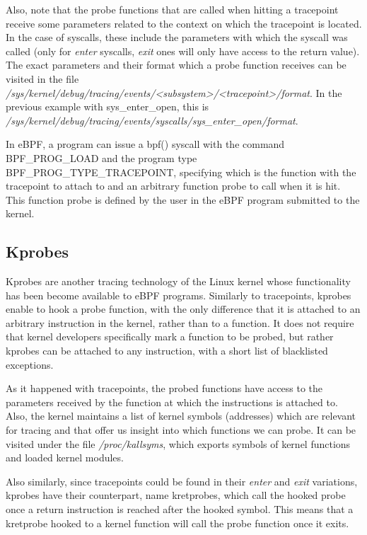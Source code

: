 \documentclass[12pt]{report} %
\begin{document}
Also, note that the probe functions that are called when hitting a tracepoint receive some parameters related to the context on which the tracepoint is located. In the case of syscalls, these include the parameters with which the syscall was called (only for \textit{enter} syscalls, \textit{exit} ones will only have access to the return value). The exact parameters and their format which a probe function receives can be visited in the file \textit{/sys/kernel/debug/tracing/events/<subsystem>/<tracepoint>/format}. In the previous example with sys\_enter\_open, this is \textit{/sys/kernel/debug/tracing/events/syscalls/sys\_enter\_open/format}.

In eBPF, a program can issue a bpf() syscall with the command BPF\_PROG\_LOAD and the program type BPF\_PROG\_TYPE\_TRACEPOINT, specifying which is the function with the tracepoint to attach to and an arbitrary function probe to call when it is hit. This function probe is defined by the user in the eBPF program submitted to the kernel.

\subsection{Kprobes}
Kprobes are another tracing technology of the Linux kernel whose functionality has been become available to eBPF programs. Similarly to tracepoints, kprobes enable to hook a probe function, with the only difference that it is attached to an arbitrary instruction in the kernel, rather than to a function\cite{kprobe_manual}. It does not require that kernel developers specifically mark a function to be probed, but rather kprobes can be attached to any instruction, with a short list of blacklisted exceptions. 

As it happened with tracepoints, the probed functions have access to the parameters received by the function at which the instructions is attached to. Also, the kernel maintains a list of kernel symbols (addresses) which are relevant for tracing and that offer us insight into which functions we can probe. It can be visited under the file \textit{/proc/kallsyms}, which exports symbols of kernel functions and loaded kernel modules\cite{kallsyms_kernel}.

Also similarly, since tracepoints could be found in their \textit{enter} and \textit{exit} variations, kprobes have their counterpart, name kretprobes, which call the hooked probe once a return instruction is reached after the hooked symbol. This means that a kretprobe hooked to a kernel function will call the probe function once it exits.
\end{document}
